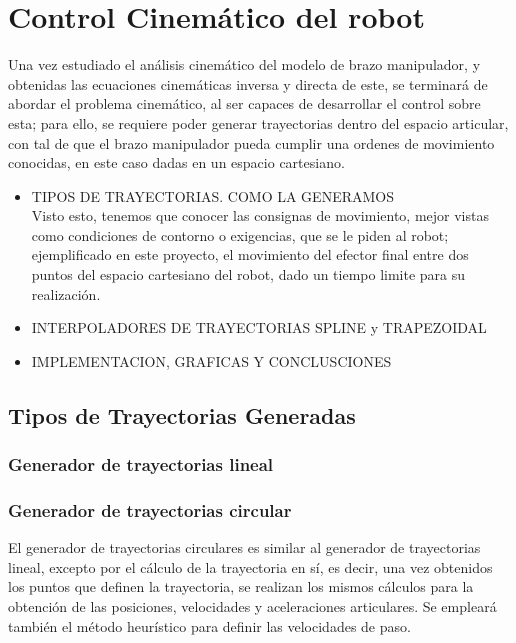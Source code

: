 \section{Control Cinemático del robot}
Una vez estudiado el análisis cinemático del modelo de brazo manipulador, y obtenidas las ecuaciones cinemáticas inversa 
y directa de este, se terminará de abordar el problema cinemático, al ser capaces de desarrollar el control sobre esta; para ello, 
se requiere poder generar trayectorias dentro del espacio articular, con tal de que el brazo manipulador pueda cumplir una ordenes de 
movimiento conocidas, en este caso dadas en un espacio cartesiano.\\

\begin{itemize}

\item TIPOS DE TRAYECTORIAS. COMO LA GENERAMOS \\
Visto esto, tenemos que conocer las consignas de movimiento, mejor vistas como condiciones de contorno o exigencias, que se le piden al robot; ejemplificado en este proyecto, el movimiento del efector final entre dos puntos del espacio cartesiano del robot, dado un tiempo limite para su realización.\\

	\item INTERPOLADORES DE TRAYECTORIAS \rightarrow SPLINE y TRAPEZOIDAL
	\item IMPLEMENTACION, GRAFICAS Y CONCLUSCIONES
\end{itemize}
\subsection{Tipos de Trayectorias Generadas}
	\subsubsection{Generador de trayectorias lineal}

	\subsubsection{Generador de trayectorias circular}
	El generador de trayectorias circulares es similar al generador de trayectorias lineal, excepto por el cálculo de la trayectoria en sí, es decir, una vez obtenidos los puntos que definen la trayectoria, se realizan los mismos cálculos para la obtención de las posiciones, velocidades y aceleraciones articulares. Se empleará también el método heurístico para definir las velocidades de paso.\\

